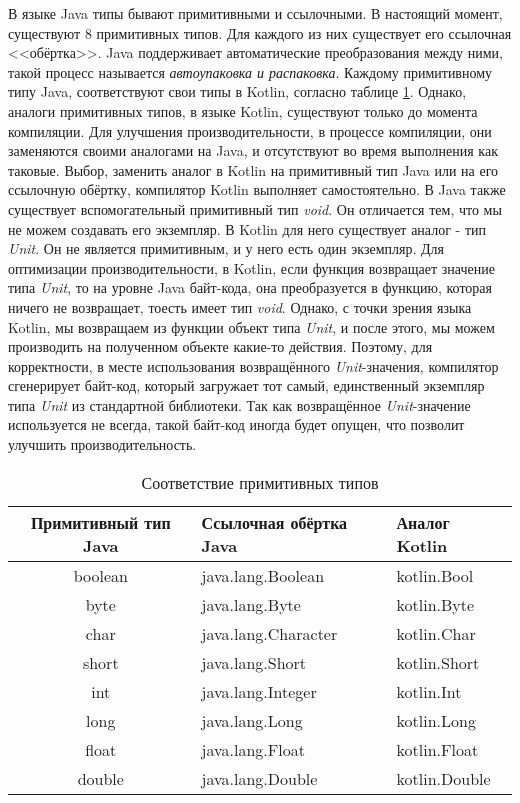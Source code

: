 В языке Java типы бывают примитивными и ссылочными. В настоящий момент, существуют 8 примитивных типов. Для каждого из них существует его ссылочная <<обёртка>>. Java поддерживает автоматические преобразования между ними, такой процесс называется \textit{автоупаковка и распаковка}. Каждому примитивному типу Java, соответствуют свои типы в Kotlin, согласно таблице \ref{tab:primitiveKotlinVsJava}. Однако, аналоги примитивных типов, в языке Kotlin, существуют только до момента компиляции. Для улучшения производительности, в процессе компиляции, они заменяются своими аналогами на Java, и отсутствуют во время выполнения как таковые. Выбор, заменить аналог в Kotlin на примитивный тип Java или на его ссылочную обёртку, компилятор Kotlin выполняет самостоятельно.
В Java также существует вспомогательный примитивный тип \textit{void}. Он отличается тем, что мы не можем создавать его экземпляр. В Kotlin для него существует аналог - тип \textit{Unit}. Он не является примитивным, и у него есть один экземпляр. Для оптимизации производительности, в Kotlin, если функция возвращает значение типа \textit{Unit}, то на уровне Java байт-кода, она преобразуется в функцию, которая ничего не возвращает, тоесть имеет тип \textit{void}. Однако, с точки зрения языка Kotlin, мы возвращаем из функции объект типа \textit{Unit}, и после этого, мы можем производить на полученном объекте какие-то действия. Поэтому, для корректности, в месте использования возвращённого \textit{Unit}-значения, компилятор сгенерирует байт-код, который загружает тот самый, единственный экземпляр типа \textit{Unit} из стандартной библиотеки. Так как возвращённое \textit{Unit}-значение используется не всегда, такой байт-код иногда будет опущен, что позволит улучшить производительность.



\begin{table}[h]
\caption{\label{tab:primitiveKotlinVsJava}Соответствие примитивных типов}
\begin{center}
\begin{tabular}{|c|l|l|}
\hline
Примитивный тип Java & Ссылочная обёртка Java & Аналог Kotlin \\
\hline
boolean  & java.lang.Boolean  & kotlin.Bool  \\
byte  & java.lang.Byte & kotlin.Byte \\
char  & java.lang.Character & kotlin.Char \\
short  & java.lang.Short & kotlin.Short \\
int & java.lang.Integer & kotlin.Int \\
long &  java.lang.Long & kotlin.Long \\
float & java.lang.Float & kotlin.Float \\
double & java.lang.Double & kotlin.Double \\
\hline
\end{tabular}
\end{center}
\end{table}



